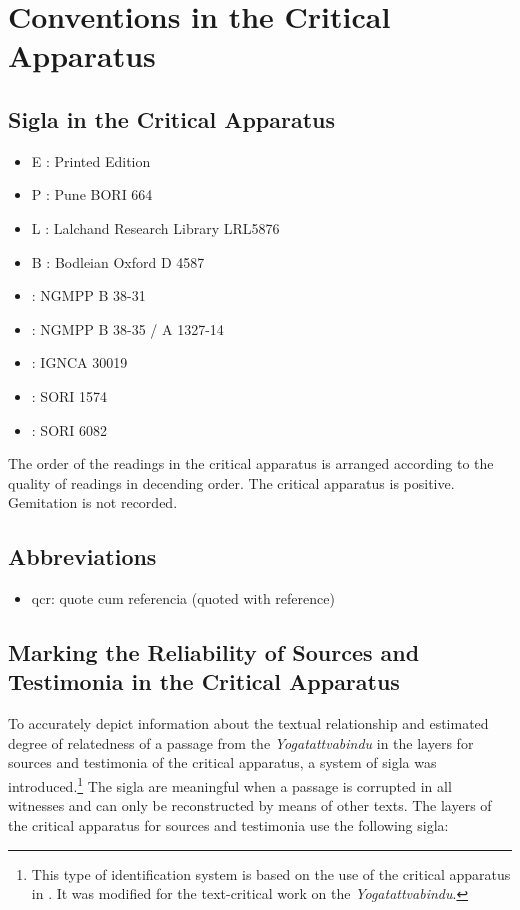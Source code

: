 \chapter{Conventions in the Critical Apparatus}
\section{Sigla in the Critical Apparatus}

\begin{itemize}
\item E : Printed Edition
\item P : Pune BORI 664
\item L : Lalchand Research Library LRL5876
\item B : Bodleian Oxford D 4587
\item \None : NGMPP B 38-31
\item \Ntwo : NGMPP B 38-35 / A 1327-14
\item \Done : IGNCA 30019
\item \Uone : SORI 1574
\item \Utwo: SORI 6082
\end{itemize}

The order of the readings in the critical apparatus is arranged according to the quality of readings in decending order. The critical apparatus is positive. Gemitation is not recorded. 

\section{Abbreviations}
\begin{itemize}
  \item qcr: quote cum referencia (quoted with reference)
  \end{itemize}

\section{Marking the Reliability of Sources and Testimonia in the Critical Apparatus}
\label{kennz}

To accurately depict information about the textual relationship and estimated degree of relatedness of a passage from the \textit{Yogatattvabindu} in the layers for sources and testimonia of the critical apparatus, a system of sigla was introduced.\footnote{This type of identification system is based on the use of the critical apparatus in \parencite[lii-liii]{steinkellner2005}. It was modified for the text-critical work on the \textit{Yogatattvabindu}.} The sigla are meaningful when a passage is corrupted in all witnesses and can only be reconstructed by means of other texts. The layers of the critical apparatus for sources and testimonia use the following sigla:

